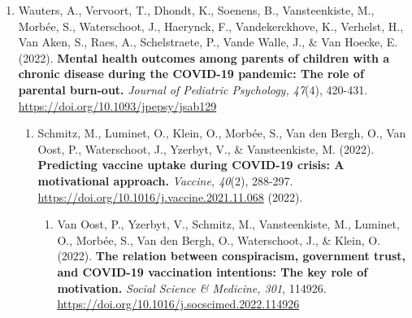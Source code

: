 \documentclass[
  twocolumn]{article}
\providecommand{\tightlist}{%
  \setlength{\itemsep}{0pt}\setlength{\parskip}{0pt}}
\begin{document}
\begin{enumerate}
\begin{enumerate}
\begin{enumerate}
\begin{enumerate}
\begin{enumerate}
\begin{enumerate}
\begin{enumerate}
\begin{enumerate}
                \begin{enumerate}
                \def\labelenumix{\arabic{enumix}.}
                \tightlist
                \item
                  Wauters, A., Vervoort, T., Dhondt, K., Soenens, B.,
                  Vansteenkiste, M., Morbée, S., Waterschoot, J.,
                  Haerynck, F., Vandekerckhove, K., Verhelst, H., Van
                  Aken, S., Raes, A., Schelstraete, P., Vande Walle, J.,
                  \& Van Hoecke, E. (2022). \textbf{Mental health
                  outcomes among parents of children with a chronic
                  disease during the COVID-19 pandemic: The role of
                  parental burn-out.} \emph{Journal of Pediatric
                  Psychology, 47}(4), 420-431.
                  \url{https://doi.org/10.1093/jpepsy/jsab129}

                  \begin{enumerate}
                  \def\labelenumx{\arabic{enumx}.}
                  \tightlist
                  \item
                    Schmitz, M., Luminet, O., Klein, O., Morbée, S., Van
                    den Bergh, O., Van Oost, P., Waterschoot, J.,
                    Yzerbyt, V., \& Vansteenkiste, M. (2022).
                    \textbf{Predicting vaccine uptake during COVID-19
                    crisis: A motivational approach.} \emph{Vaccine,
                    40}(2), 288-297.
                    \url{https://doi.org/10.1016/j.vaccine.2021.11.068}
                    (2022).

                    \begin{enumerate}
                    \def\labelenumxi{\arabic{enumxi}.}
                    \tightlist
                    \item
                      Van Oost, P., Yzerbyt, V., Schmitz, M.,
                      Vansteenkiste, M., Luminet, O., Morbée, S., Van
                      den Bergh, O., Waterschoot, J., \& Klein, O.
                      (2022). \textbf{The relation between conspiracism,
                      government trust, and COVID-19 vaccination
                      intentions: The key role of motivation.}
                      \emph{Social Science \& Medicine, 301}, 114926.
                      \url{https://doi.org/10.1016/j.socscimed.2022.114926}


\end{enumerate}
\end{enumerate}
\end{enumerate}
\end{enumerate}
\end{enumerate}
\end{enumerate}
\end{enumerate}
\end{enumerate}
\end{enumerate}
\end{enumerate}
\end{enumerate}
\end{document}
